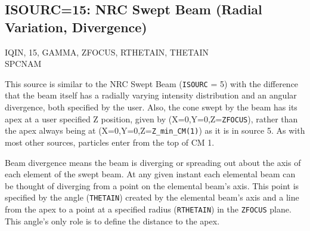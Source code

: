 \documentclass[12pt,twoside]{article}
\newcommand{\cen}[1]{\begin{center} #1 \end{center}                   }
\begin{document}
\clearpage
\subsection{ISOURC=15: NRC Swept Beam (Radial Variation,
Divergence)}
\cen{IQIN, 15, GAMMA, ZFOCUS, RTHETAIN, THETAIN \\ SPCNAM}
This source is similar to the NRC Swept Beam ({\tt ISOURC} = 5) with the
difference that the beam itself has a radially varying intensity
distribution and an angular divergence, both specified by the user.  Also,
the cone swept by the beam has its apex at a user specified Z position,
given by (X=0,Y=0,Z={\tt ZFOCUS}), rather than the apex always being
at (X=0,Y=0,Z={\tt Z\_min\_CM(1)}) as it is in source 5.  As with most
other sources, particles enter from the top of CM 1.

Beam divergence means the beam is diverging or
spreading out about the axis of each element of the swept beam. At any
given instant   each
elemental beam can be thought of diverging from a point on the elemental
beam's axis. This point is specified by the angle ({\tt THETAIN})
created by the elemental beam's axis and a line from the apex to a
point at a specified radius ({\tt RTHETAIN}) in the {\tt ZFOCUS} plane.  This
angle's only role is to define the distance to the apex.
\end{document}
